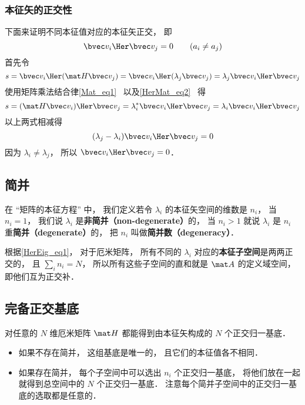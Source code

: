 \subsubsection{本征矢的正交性}
下面来证明不同本征值对应的本征矢正交， 即
\begin{equation}\label{HerEig_eq1}
\bvec v_i\Her \bvec v_j = 0 \qquad (a_i \ne a_j)
\end{equation}
首先令
\begin{equation}
s = \bvec v_i\Her (\mat H \bvec v_j) = \bvec v_i\Her (\lambda_j \bvec v_j) = \lambda_j \bvec v_i\Her \bvec v_j
\end{equation}
使用矩阵乘法结合律\autoref{Mat_eq1}~ 以及\autoref{HerMat_eq2}~ 得
\begin{equation}
s = (\mat H \bvec v_i)\Her \bvec v_j = \lambda_i^* \bvec v_i\Her \bvec v_j = \lambda_i \bvec v_i\Her \bvec v_j
\end{equation}
以上两式相减得 %
\begin{equation}
(\lambda_j - \lambda_i)\bvec v_i\Her \bvec v_j = 0
\end{equation}
因为 $\lambda_i \ne \lambda_j$， 所以 $\bvec v_i\Her \bvec v_j = 0$．

\subsection{简并}\label{HerEig_sub1}
在 “矩阵的本征方程” 中， 我们定义若令 $\lambda_i$ 的本征矢空间的维数是 $n_i$， 当 $n_i = 1$， 我们说 $\lambda_i$ 是\textbf{非简并（non-degenerate）}的， 当 $n_i > 1$ 就说 $\lambda_i$ 是 $n_i$ 重\textbf{简并（degenerate）}的， 把 $n_i$ 叫做\textbf{简并数（degeneracy）}．

根据\autoref{HerEig_eq1}， 对于厄米矩阵， 所有不同的 $\lambda_i$ 对应的\textbf{本征子空间}是两两正交的， 且 $\sum_i n_i = N$， 所以所有这些子空间的直和就是 $\mat A$ 的定义域空间， 即他们互为正交补．

\subsection{完备正交基底}
对任意的 $N$ 维厄米矩阵 $\mat H$ 都能得到由本征矢构成的 $N$ 个正交归一基底．
\begin{itemize}
\item 如果不存在简并， 这组基底是唯一的， 且它们的本征值各不相同．
\item 如果存在简并， 每个子空间中可以选出 $n_i$ 个正交归一基底， 将他们放在一起就得到总空间中的 $N$ 个正交归一基底． 注意每个简并子空间中的正交归一基底的选取都是任意的．
\end{itemize}
